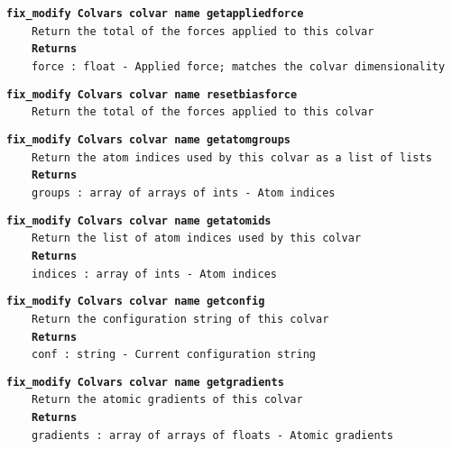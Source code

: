 \begin{mdexampleinput}{}
\texttt{\textbf{fix\_modify Colvars colvar name getappliedforce}}
\\
\-~~~~\texttt{Return the total of the forces applied to this colvar}
\\
\-~~~~\texttt{\textbf{Returns}}
\\
\-~~~~\texttt{force : float - Applied force; matches the colvar dimensionality}
\end{mdexampleinput}
\begin{mdexampleinput}{}
\texttt{\textbf{fix\_modify Colvars colvar name resetbiasforce}}
\\
\-~~~~\texttt{Return the total of the forces applied to this colvar}
\end{mdexampleinput}
\begin{mdexampleinput}{}
\texttt{\textbf{fix\_modify Colvars colvar name getatomgroups}}
\\
\-~~~~\texttt{Return the atom indices used by this colvar as a list of lists}
\\
\-~~~~\texttt{\textbf{Returns}}
\\
\-~~~~\texttt{groups : array of arrays of ints - Atom indices}
\end{mdexampleinput}
\begin{mdexampleinput}{}
\texttt{\textbf{fix\_modify Colvars colvar name getatomids}}
\\
\-~~~~\texttt{Return the list of atom indices used by this colvar}
\\
\-~~~~\texttt{\textbf{Returns}}
\\
\-~~~~\texttt{indices : array of ints - Atom indices}
\end{mdexampleinput}
\begin{mdexampleinput}{}
\texttt{\textbf{fix\_modify Colvars colvar name getconfig}}
\\
\-~~~~\texttt{Return the configuration string of this colvar}
\\
\-~~~~\texttt{\textbf{Returns}}
\\
\-~~~~\texttt{conf : string - Current configuration string}
\end{mdexampleinput}
\begin{mdexampleinput}{}
\texttt{\textbf{fix\_modify Colvars colvar name getgradients}}
\\
\-~~~~\texttt{Return the atomic gradients of this colvar}
\\
\-~~~~\texttt{\textbf{Returns}}
\\
\-~~~~\texttt{gradients : array of arrays of floats - Atomic gradients}
\end{mdexampleinput}
